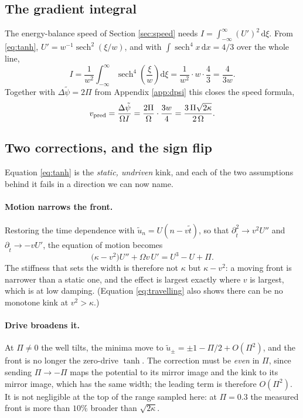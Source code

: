 \subsection*{The gradient integral}

The energy-balance speed of Section \ref{sec:speed} needs
$I = \int_{-\infty}^{\infty} (U')^2 \,\mathrm{d}\xi$. From \eqref{eq:tanh},
$U' = w^{-1}\operatorname{sech}^2(\xi/w)$, and with
$\int \operatorname{sech}^4 x \,\mathrm{d}x = 4/3$ over the whole line,
%
\begin{equation}
  I = \frac{1}{w^{2}}\int_{-\infty}^{\infty}
      \operatorname{sech}^{4}\!\left(\frac{\xi}{w}\right) \mathrm{d}\xi
    = \frac{1}{w^{2}} \cdot w \cdot \frac{4}{3}
    = \frac{4}{3w}.
  \label{eq:I}
\end{equation}
%
Together with $\Delta\tilde\psi = 2\Pi$ from Appendix \ref{app:dpsi} this closes
the speed formula,
%
\begin{equation}
  v_{\rm pred} = \frac{\Delta\tilde\psi}{\Omega I}
         = \frac{2\Pi}{\Omega}\cdot\frac{3w}{4}
         = \frac{3\,\Pi\sqrt{2\kappa}}{2\,\Omega}.
  \label{eq:closed}
\end{equation}

\subsection*{Two corrections, and the sign flip}

Equation \eqref{eq:tanh} is the \emph{static, undriven} kink, and each of the two
assumptions behind it fails in a direction we can now name.

\paragraph{Motion narrows the front.} Restoring the time dependence with
$\tilde u_n = U(n - v\tilde t)$, so that
$\partial_{\tilde t}^2 \to v^2 U''$ and $\partial_{\tilde t} \to -vU'$, the
equation of motion becomes
%
\begin{equation}
  \bigl(\kappa - v^{2}\bigr) U'' + \Omega v\, U' = U^3 - U + \Pi .
  \label{eq:travelling}
\end{equation}
%
The stiffness that sets the width is therefore not $\kappa$ but $\kappa - v^2$: a
moving front is narrower than a static one, and the effect is largest exactly
where $v$ is largest, which is at low damping. (Equation \eqref{eq:travelling}
also shows there can be no monotone kink at $v^2 > \kappa$.)

\paragraph{Drive broadens it.} At $\Pi \neq 0$ the well tilts, the minima move to
$\tilde u_\pm = \pm 1 - \Pi/2 + O(\Pi^2)$, and the front is no longer the
zero-drive $\tanh$. The correction must be \emph{even} in $\Pi$, since sending
$\Pi \to -\Pi$ maps the potential to its mirror image and the kink to its mirror
image, which has the same width; the leading term is therefore $O(\Pi^2)$. It is
not negligible at the top of the range sampled here: at $\Pi = 0.3$ the measured
front is more than $10\%$ broader than $\sqrt{2\kappa}$.

